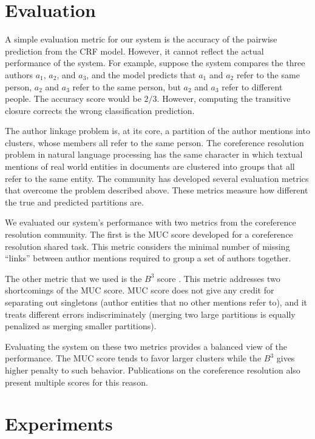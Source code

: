 \documentclass[twocolumn,letterpaper]{article}
\begin{document}
\section{Evaluation} %
\label{sec:evaluation}
A simple evaluation metric for our system is the accuracy
of the pairwise prediction from the CRF model.  However, it cannot
reflect the actual performance of the system.  For example, suppose
the system compares the three authors $a_1$, $a_2$, and $a_3$, and the
model predicts that $a_1$ and $a_2$ refer to the same person, $a_2$
and $a_3$ refer to the same person, but $a_2$ and $a_3$ refer to
different people.  The accuracy score would be $2/3$.  However,
computing the transitive closure corrects the wrong classification
prediction.

The author linkage problem is, at its core, a partition of the author
mentions into clusters, whose members all refer to the same person.
The coreference resolution problem in natural language processing has
the same character in which textual mentions of real world entities in
documents are clustered into groups that all refer to the same entity.
The community has developed several evaluation metrics that overcome
the problem described above.  These metrics measure how different the
true and predicted partitions are.

We evaluated our system's performance with two metrics from the
coreference resolution community.  The first is the MUC score
\cite{Vilain95} developed for a coreference resolution shared task.
This metric considers the minimal number of missing ``links'' between
author mentions required to group a set of authors together.

The other metric that we used is the $B^3$ score \cite{Bagga98b}.
This metric addresses two shortcomings of the MUC score.  MUC score
does not give any credit for separating out singletons (author
entities that no other mentions refer to), and it treats different
errors indiscriminately (merging two large partitions is equally
penalized as merging smaller partitions).

Evaluating the system on these two metrics provides a balanced view of
the performance.  The MUC score tends to favor larger clusters while
the $B^3$ gives higher penalty to such behavior.  Publications on the
coreference resolution also present multiple scores for this reason.

\section{Experiments} %
\label{sec:experiments}
\end{document}
